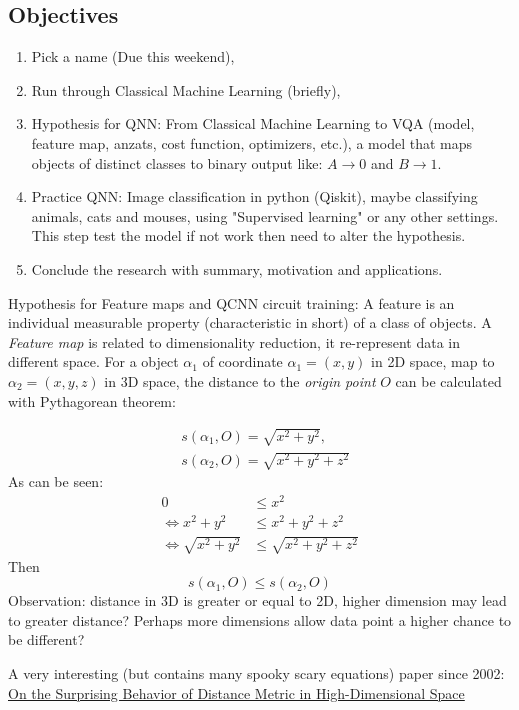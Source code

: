 \subsection{Objectives}
\begin{enumerate}
    \item Pick a name (Due this weekend),
    \item Run through Classical Machine Learning (briefly),
    \item Hypothesis for QNN: From Classical Machine Learning to VQA (model, feature map, anzats, cost function, optimizers, etc.), a model that maps objects of distinct classes to binary output like: $A \to 0$ and $B \to 1$.
    \item Practice QNN: Image classification in python (Qiskit), maybe classifying animals, cats and mouses, using "Supervised learning" or any other settings. This step test the model if not work then need to alter the hypothesis.
    \item Conclude the research with summary, motivation and applications.
\end{enumerate}

Hypothesis for Feature maps and QCNN circuit training: A feature is an individual measurable property (characteristic in short) of a class of objects. A \textit{Feature map} is related to dimensionality reduction, it re-represent data in different space.
For a object $\alpha_1$ of coordinate $\alpha_1 = (x, y)$ in 2D space, map to $\alpha_2 = (x, y, z)$ in 3D space, the distance to the \textit{origin point} $O$ can be calculated with Pythagorean theorem:

\begin{equation}
    \begin{split}
        &s(\alpha_1, O) = \sqrt{x^2 + y^2}, \\
        &s(\alpha_2, O) = \sqrt{x^2 + y^2 + z^2}
    \end{split}
\end{equation}
As can be seen:
\begin{equation}
    \begin{split}
        0 &\leq x^2\\
        \iff x^2 + y^2 &\leq x^2 + y^2 + z^2 \\
        \iff \sqrt{x^2 + y^2} &\leq \sqrt{x^2 + y^2 + z^2}
    \end{split}
\end{equation}
Then
\begin{equation}
    s(\alpha_1, O) \leq s(\alpha_2, O)
\end{equation}
Observation: distance in 3D is greater or equal to 2D, higher dimension may lead to greater distance? Perhaps more dimensions allow data point a higher chance to be different?

A very interesting (but contains many spooky scary equations) paper since 2002: \href{https://www.researchgate.net/publication/30013021_On_the_Surprising_Behavior_of_Distance_Metric_in_High-Dimensional_Space}{On the Surprising Behavior of Distance Metric in High-Dimensional Space}